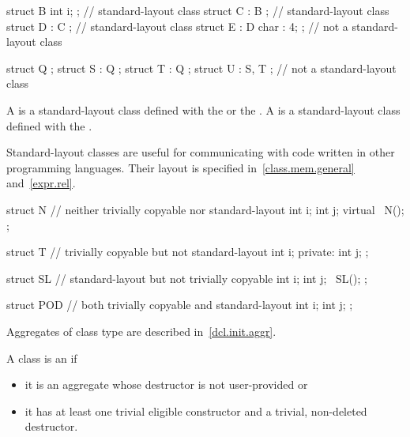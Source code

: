 \pnum
\begin{example}
\begin{codeblock}
struct B { int i; };            // standard-layout class
struct C : B { };               // standard-layout class
struct D : C { };               // standard-layout class
struct E : D { char : 4; };     // not a standard-layout class

struct Q {};
struct S : Q { };
struct T : Q { };
struct U : S, T { };            // not a standard-layout class
\end{codeblock}
\end{example}

\pnum
A  is a standard-layout class
defined with the   or the
 .
A  is a standard-layout class
defined with the
 .

\pnum
\begin{note}
Standard-layout classes are useful for communicating with
code written in other programming languages. Their layout is specified
in~\ref{class.mem.general} and~\ref{expr.rel}.
\end{note}

\pnum
\begin{example}
\begin{codeblock}
struct N {          // neither trivially copyable nor standard-layout
  int i;
  int j;
  virtual ~N();
};

struct T {          // trivially copyable but not standard-layout
  int i;
private:
  int j;
};

struct SL {         // standard-layout but not trivially copyable
  int i;
  int j;
  ~SL();
};

struct POD {        // both trivially copyable and standard-layout
  int i;
  int j;
};
\end{codeblock}
\end{example}

\pnum
\begin{note}
Aggregates of class type are described in~\ref{dcl.init.aggr}.
\end{note}

\pnum
A class  is an  if
\begin{itemize}
\item
it is an aggregate whose destructor is not user-provided or
\item
it has at least one trivial eligible constructor and
a trivial, non-deleted destructor.
\end{itemize}

